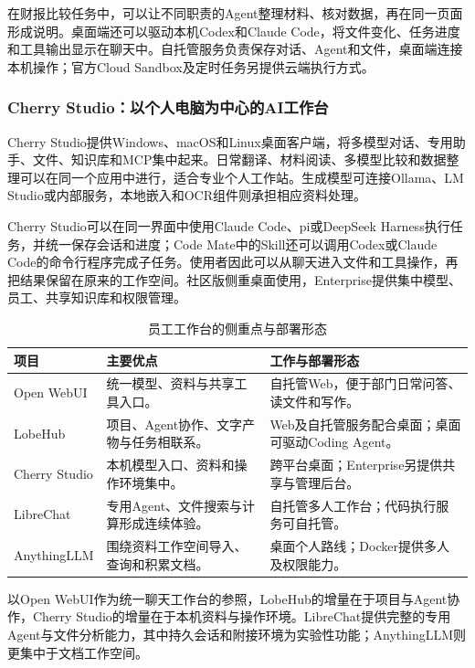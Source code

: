 在财报比较任务中，可以让不同职责的Agent整理材料、核对数据，再在同一页面形成说明。桌面端还可以驱动本机Codex和Claude Code，将文件变化、任务进度和工具输出显示在聊天中。自托管服务负责保存对话、Agent和文件，桌面端连接本机操作；官方Cloud Sandbox及定时任务另提供云端执行方式。

\subsubsection{Cherry Studio：以个人电脑为中心的AI工作台}
Cherry Studio提供Windows、macOS和Linux桌面客户端，将多模型对话、专用助手、文件、知识库和MCP集中起来。日常翻译、材料阅读、多模型比较和数据整理可以在同一个应用中进行，适合专业个人工作站。生成模型可连接Ollama、LM Studio或内部服务，本地嵌入和OCR组件则承担相应资料处理。

Cherry Studio可以在同一界面中使用Claude Code、pi或DeepSeek Harness执行任务，并统一保存会话和进度；Code Mate中的Skill还可以调用Codex或Claude Code的命令行程序完成子任务。使用者因此可以从聊天进入文件和工具操作，再把结果保留在原来的工作空间。社区版侧重桌面使用，Enterprise提供集中模型、员工、共享知识库和权限管理。

\begin{table}[H]\small\centering
\caption{员工工作台的侧重点与部署形态}\label{tab:workbenches}
\begin{tabularx}{\linewidth}{@{}P{28mm}Y Y@{}}\toprule
项目 & 主要优点 & 工作与部署形态\\\midrule
Open WebUI & 统一模型、资料与共享工具入口。 & 自托管Web，便于部门日常问答、读文件和写作。\\
LobeHub & 项目、Agent协作、文字产物与任务相联系。 & Web及自托管服务配合桌面；桌面可驱动Coding Agent。\\
Cherry Studio & 本机模型入口、资料和操作环境集中。 & 跨平台桌面；Enterprise另提供共享与管理后台。\\
LibreChat & 专用Agent、文件搜索与计算形成连续体验。 & 自托管多人工作台；代码执行服务可自托管。\\
AnythingLLM & 围绕资料工作空间导入、查询和积累文档。 & 桌面个人路线；Docker提供多人及权限能力。\\\bottomrule
\end{tabularx}
\end{table}

以Open WebUI作为统一聊天工作台的参照，LobeHub的增量在于项目与Agent协作，Cherry Studio的增量在于本机资料与操作环境。LibreChat提供完整的专用Agent与文件分析能力，其中持久会话和附接环境为实验性功能；AnythingLLM则更集中于文档工作空间。

